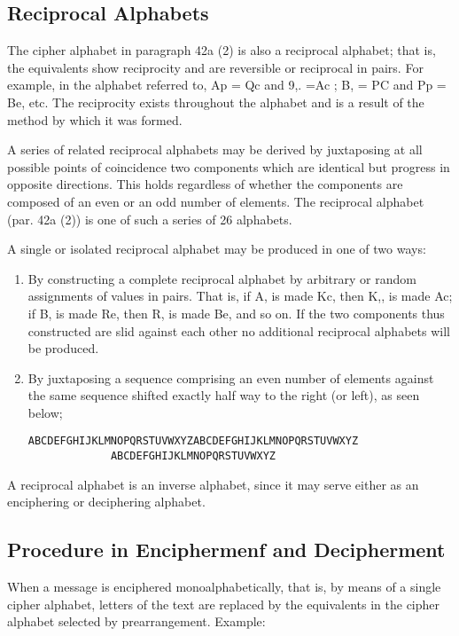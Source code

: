 \subsection{Reciprocal Alphabets}

\mypara The cipher alphabet in paragraph 42a (2) is also a reciprocal
alphabet; that is, the equivalents show reciprocity and are reversible or
reciprocal in pairs. For example, in the alphabet referred to, Ap = Qc
and 9,. =Ac ; B, = PC and Pp = Be, etc. The reciprocity exists throughout the alphabet and is a result of the method by which it was formed.

\mypara A series of related reciprocal alphabets may be derived by juxtaposing at all possible points of coincidence two components which are identical but progress in opposite directions. This holds regardless of whether
the components are composed of an even or an odd number of elements.
The reciprocal alphabet (par. 42a (2)) is one of such a series of 26
alphabets.

\mypara A single or isolated reciprocal alphabet may be produced in one of
two ways:

\begin{enumerate}
\item By constructing a complete reciprocal alphabet by arbitrary or
random assignments of values in pairs. That is, if A, is made
Kc, then K,, is made Ac; if B, is made Re, then R, is made Be,
and so on. If the two components thus constructed are slid
against each other no additional reciprocal alphabets will be
produced.

\item By juxtaposing a sequence comprising an even number of
elements against the same sequence shifted exactly half way to
the right (or left), as seen below;

\begin{verbatim}
ABCDEFGHIJKLMNOPQRSTUVWXYZABCDEFGHIJKLMNOPQRSTUVWXYZ
             ABCDEFGHIJKLMNOPQRSTUVWXYZ
\end{verbatim}
\end{enumerate}

\mypara A reciprocal alphabet is an inverse alphabet, since it may serve
either as an enciphering or deciphering alphabet.

\subsection{Procedure in Enciphermenf and Decipherment}

\mypara When a message is enciphered monoalphabetically, that is, by
means of a single cipher alphabet, letters of the text are replaced by the
equivalents in the cipher alphabet selected by prearrangement. Example:

